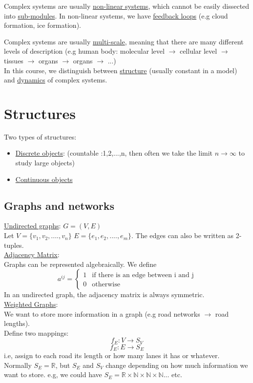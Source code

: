 \documentclass[11pt]{book}
\begin{document}
Complex systems are usually \underline{non-linear systems}, which cannot be easily dissected into \underline{sub-modules}. In non-linear systems, we have \underline{feedback loops} (e.g cloud formation, ice formation).

Complex systems are usually \underline{multi-scale}, meaning that there are many different levels of description (e.g human body: molecular level $\rightarrow$ cellular level $\rightarrow$ tissues $\rightarrow$ organs $\rightarrow$ organs $\rightarrow$ ...)\\

In this course, we distinguish between \underline{structure} (usually constant in a model) and \underline{dynamics} of complex systems.


\chapter{Structures}

Two types of structures:
\begin{itemize}
\item \underline{Discrete objects}: (countable :1,2,...,n, then often we take the limit $n \rightarrow \infty$ to study large objects)
\item \underline{Continuous objects}
\end{itemize}
\section{Graphs and networks}
\underline{Undirected graphs}: $G = (V,E)$\\

Let $V = \{v_{1},v_{2},....,v_{n}\}$ $E = \{e_{1},e_{2},....,e_{m}\}$. The edges can also be written as 2-tuples.\\

\underline{Adjacency Matrix}:\\

Graphs can be represented algebraically. We define $$a^{ij} = \begin{cases} 1 &\mbox{if there is an edge between i and j} \\ 0 &\mbox{otherwise} \end{cases}$$
In an undirected graph, the adjacency matrix is always symmetric.\\

\underline{Weighted Graphs}:\\
We want to store more information in a graph (e.g road networks $\rightarrow$ road lengths).\\
Define two mappings: $$f_{E}:V\rightarrow S_{V}$$ $$f_{E}:E\rightarrow S_{E}$$
i.e, assign to each road its length or how many lanes it has or whatever.\\
Normally $S_{E} = \mathbb{R}$, but $S_{E}$ and $S_{V}$ change depending on how much information we want to store. e.g, we could have $S_{E} = \mathbb{R}\times\mathbb{N}\times\mathbb{N}\times\mathbb{N}...$ etc.\\
\end{document}
